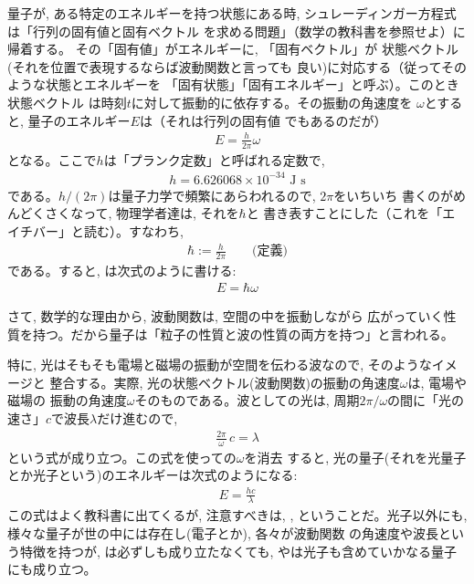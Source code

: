 量子が, ある特定のエネルギーを持つ状態にある時, 
シュレーディンガー方程式は「行列の固有値と固有ベクトル
を求める問題」（数学の教科書を参照せよ）に帰着する。
その「固有値」がエネルギーに, 「固有ベクトル」が
状態ベクトル(それを位置で表現するならば波動関数と言っても
良い)に対応する（従ってそのような状態とエネルギーを
「固有状態」「固有エネルギー」と呼ぶ）。このとき状態ベクトル
は時刻$t$に対して振動的に依存する。その振動の角速度を
$\omega$とすると, 量子のエネルギー$E$は（それは行列の固有値
でもあるのだが）
\begin{eqnarray}
E=\frac{h}{2\pi}\omega\label{eq:E_h_omega}
\end{eqnarray}
となる。ここで$h$は「プランク定数」と呼ばれる定数で, 
\begin{eqnarray}
h=6.626068\times10^{-34}\text{ J s}
\end{eqnarray}
である。$h/(2\pi)$は量子力学で頻繁にあらわれるので, $2\pi$をいちいち
書くのがめんどくさくなって, 物理学者達は, それを$\hbar$と
書き表すことにした（これを「エイチバー」と読む）。すなわち, 
\begin{eqnarray}
\hbar:=\frac{h}{2\pi}\quad\quad\text{(定義)}\label{eq:def_hbar}
\end{eqnarray}
である。すると, は次式のように書ける:
\begin{eqnarray}
E=\hbar \omega\label{eq:E_hbar_omega}
\end{eqnarray}

さて, 数学的な理由から, 波動関数は, 空間の中を振動しながら
広がっていく性質を持つ。だから量子は「粒子の性質と波の性質の両方を持つ」と言われる。

特に, 光はそもそも電場と磁場の振動が空間を伝わる波なので, そのようなイメージと
整合する。実際, 光の状態ベクトル(波動関数)の振動の角速度$\omega$は, 電場や磁場の
振動の角速度$\omega$そのものである。波としての光は, 周期$2\pi/\omega$の間に「光の速さ」$c$で波長$\lambda$だけ進むので, 
\begin{eqnarray}
\frac{2\pi}{\omega}\,c=\lambda
\end{eqnarray}
という式が成り立つ。この式を使っての$\omega$を消去
すると, 光の量子(それを光量子とか光子という)のエネルギーは次式のようになる:
\begin{eqnarray}
E=\frac{hc}{\lambda}\label{eq:E_photon}
\end{eqnarray}
この式はよく教科書に出てくるが, 注意すべきは, 
, 
ということだ。光子以外にも, 様々な量子が世の中には存在し(電子とか), 各々が波動関数
の角速度や波長という特徴を持つが, は必ずしも成り立たなくても, 
やは光子も含めていかなる量子にも成り立つ。

